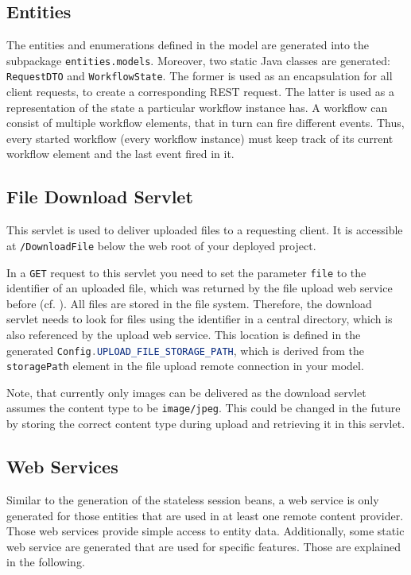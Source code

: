 \subsection{Entities}
The entities and enumerations defined in the \MD model are generated into the subpackage \lstinline|entities.models|. Moreover, two static Java classes are generated:  \lstinline|RequestDTO| and \lstinline|WorkflowState|. The former is used as an encapsulation for all client requests, \eg to create a corresponding REST request. The latter is used as a representation of the state a particular workflow instance has. A workflow can consist of multiple workflow elements, that in turn can fire different events. Thus, every started workflow (\ie every workflow instance) must keep track of its current workflow element and the last event fired in it.

\subsection{File Download Servlet}
This servlet is used to deliver uploaded files to a requesting client. It is accessible at \lstinline|/DownloadFile| below the web root of your deployed project. 

In a \lstinline[language=Simple]|GET| request to this servlet you need to set the parameter \lstinline|file| to the identifier of an uploaded file, which was returned by the file upload web service before (cf. ). 
All files are stored in the file system. Therefore, the download servlet needs to look for files using the identifier in a central directory, which is also referenced by the upload web service. This location  is defined in the generated \lstinline[language=Java]|Config.UPLOAD_FILE_STORAGE_PATH|, which is derived from the \lstinline|storagePath| element in the file upload remote connection in your model.

Note, that currently only images can be delivered as the download servlet assumes the content type to be \lstinline|image/jpeg|. This could be changed in the future by storing the correct content type during upload and retrieving it in this servlet.

\subsection{Web Services}
Similar to the generation of the stateless session beans, a web service is only generated for those entities that are used in at least one remote content provider. Those web services provide simple access to entity data.
Additionally, some static web service are generated that are used for specific features. Those are explained in the following.

